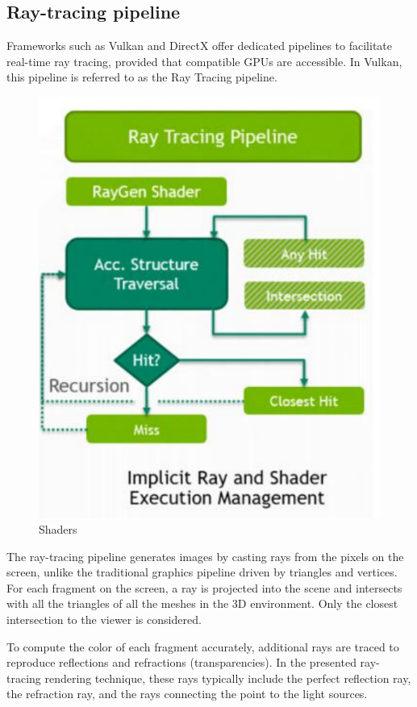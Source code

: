 \subsection{Ray-tracing pipeline}
Frameworks such as Vulkan and DirectX offer dedicated pipelines to facilitate real-time ray tracing, provided that compatible GPUs are accessible. 
In Vulkan, this pipeline is referred to as the Ray Tracing pipeline.
\begin{figure}[H]
    \centering
    \includegraphics[width=1\linewidth]{images/rayt.png}
    \caption{Shaders}
\end{figure}
The ray-tracing pipeline generates images by casting rays from the pixels on the screen, unlike the traditional graphics pipeline driven by triangles and vertices. 
For each fragment on the screen, a ray is projected into the scene and intersects with all the triangles of all the meshes in the 3D environment. 
Only the closest intersection to the viewer is considered.

To compute the color of each fragment accurately, additional rays are traced to reproduce reflections and refractions (transparencies). 
In the presented ray-tracing rendering technique, these rays typically include the perfect reflection ray, the refraction ray, and the rays connecting the point to the light sources.

